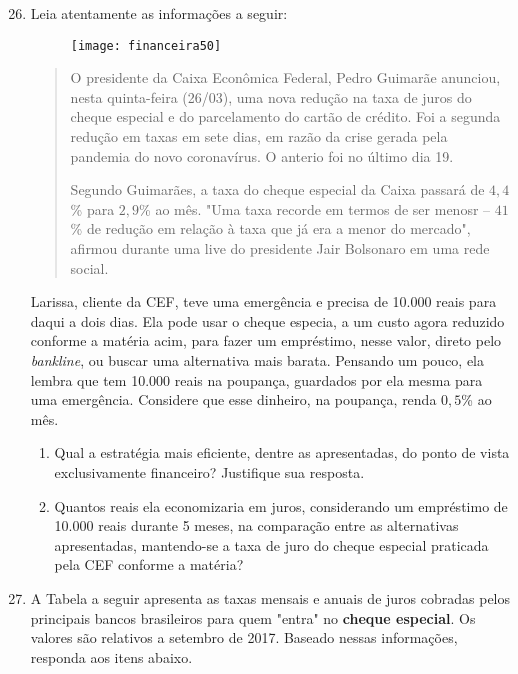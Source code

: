\begin{enumerate}\setcounter{enumi}{25}
\item Leia atentamente as informações a seguir:

\begin{figure}[H]
\centering

\texttt{[image: financeira50]}
\end{figure}

\begin{quote}
O presidente da Caixa Econômica Federal, Pedro Guimarãe anunciou, nesta quinta-feira (26/03), uma nova redução na taxa de juros do cheque especial e do parcelamento do cartão de crédito. Foi a segunda redução em taxas em sete dias, em razão da crise gerada pela pandemia do novo coronavírus. O anterio foi no último dia 19.

Segundo Guimarães, a taxa do cheque especial da Caixa passará de $4{,}4$\% para $2{,}9$\% ao mês. "Uma taxa recorde em termos de ser menosr -- $41$\% de redução em relação à taxa que já era a menor do mercado", afirmou durante uma live do presidente Jair Bolsonaro em uma rede social.
\end{quote}

Larissa, cliente da CEF, teve uma emergência e precisa de 10.000 reais para daqui a dois dias. Ela pode usar o cheque especia, a um custo agora reduzido conforme a matéria acim, para fazer um empréstimo, nesse valor, direto pelo \textit{bankline}, ou buscar uma alternativa mais barata. Pensando um pouco, ela lembra que tem 10.000 reais na poupança, guardados por ela mesma para uma emergência. Considere que esse dinheiro, na poupança, renda $0{,}5$\% ao mês.
  \begin{enumerate}
    \item Qual a estratégia mais eficiente, dentre as apresentadas, do ponto de vista exclusivamente financeiro? Justifique sua resposta.
    \item Quantos reais ela economizaria em juros, considerando um empréstimo de 10.000 reais durante 5 meses, na comparação entre as alternativas apresentadas, mantendo-se a taxa de juro do cheque especial praticada pela CEF conforme a matéria?
  \end{enumerate}

\item A Tabela a seguir apresenta as taxas mensais e anuais de juros cobradas pelos principais bancos brasileiros para quem "entra"{} no \textbf{cheque especial}. Os valores são relativos a setembro de 2017. Baseado nessas informações, responda aos itens abaixo.


\end{enumerate}
